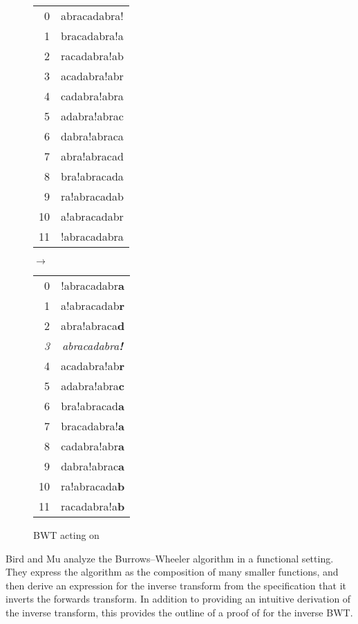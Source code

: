 \documentclass[sigplan,10pt,anonymous,review]{thesis}
\begin{document}
\begin{figure}[!hb]
  \centering
  \begin{tt}
  \begin{tabular}{rc}
    0  & abracadabra! \\
    1  & bracadabra!a \\
    2  & racadabra!ab \\
    3  & acadabra!abr \\
    4  & cadabra!abra \\
    5  & adabra!abrac \\
    6  & dabra!abraca \\
    7  & abra!abracad \\
    8  & bra!abracada \\
    9  & ra!abracadab \\
    10 & a!abracadabr \\
    11 & !abracadabra
  \end{tabular}
  $\rightarrow$
  \begin{tabular}{rc}
    0  & !abracadabr\textbf{a} \\
    1  & a!abracadab\textbf{r} \\
    2  & abra!abraca\textbf{d} \\
    \textit{3} & \textit{abracadabra\textbf{!}} \\
    4  & acadabra!ab\textbf{r} \\
    5  & adabra!abra\textbf{c} \\
    6  & bra!abracad\textbf{a} \\
    7  & bracadabra!\textbf{a} \\
    8  & cadabra!abr\textbf{a} \\
    9  & dabra!abrac\textbf{a} \\
    10 & ra!abracada\textbf{b} \\
    11 & racadabra!a\textbf{b}
  \end{tabular}
  \end{tt}
  \caption{BWT acting on }
  \label{fig:bw_ex}
\end{figure}

Bird and Mu \cite{birdmu,pearls} analyze the Burrows--Wheeler algorithm
in a functional setting. They express the algorithm as the composition
of many smaller functions, and then derive an expression for the
inverse transform from the specification that it inverts the forwards
transform. In addition to providing an intuitive derivation of the
inverse transform, this provides the outline of a proof of for the
inverse BWT.
\end{document}
